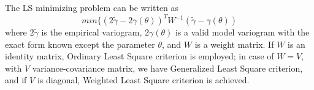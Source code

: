 
The LS minimizing problem can be written as 
\begin{equation}
min\lbrace\left(2\tilde{\gamma}-2\gamma\left(\theta\right)\right)^{T}W^{-1}\left(\tilde{\gamma}-\gamma\left(\theta\right)\right)
\end{equation}
where $2\tilde{\gamma}$ is the empirical variogram, $2\gamma\left(\theta\right)$ is a valid model variogram with the exact form known except the parameter $\theta$, and $W$ is a weight matrix. If $W$ is an identity matrix, Ordinary Least Square criterion is employed; in case of $W=V$, with $V$ variance-covariance matrix, we have Generalized Least Square criterion, and if $V$ is diagonal, Weighted Least Square criterion is achieved.


